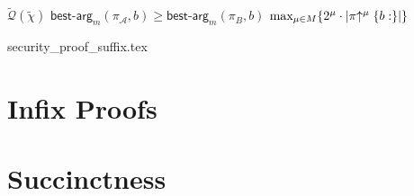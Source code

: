 \begin{algorithm}[h]
		\caption{\label{alg:suffix_verifier_soft_fork}The Suffix Verifier for the superblock NIPoPoW protocol~\cite{nipopows}}
		\begin{algorithmic}[1]
							\Let{\tilde{\pi}}{\pi}
							\Let{\tilde{\chi}}{\chi}
						\EndIf
					\EndFor
					\State\Return$\tilde{\mathcal{Q}}(\tilde{\chi})$
				\EndFunction
				\vspace{3mm}
					\State\Return$\mathsf{best\text{-}arg}_m(\pi_\mathcal{A}, b) \geq \mathsf{best\text{-}arg}_m(\pi_B, b)$
				\EndOperator
				\vspace{3mm}
					\State\Return$\text{max}_{\mu \in M}\{2^\mu \cdot \lvert \pi \negthickspace\uparrow^\mu \{b:\} \rvert \}$
				\EndFunction
		\end{algorithmic}
\end{algorithm}
 
{security_proof_suffix.tex} 
 
\section{Infix Proofs}

\section{Succinctness}
 
